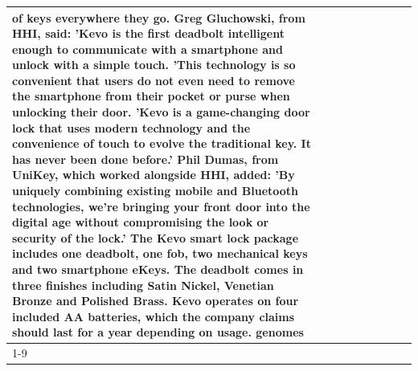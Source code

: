 \begin{table}[H]
\begin{tabular}{lllrlllll}
of keys everywhere they go. Greg Gluchowski, from HHI, said: 'Kevo is the first deadbolt intelligent enough to communicate with a smartphone and unlock with a simple touch. 'This technology is so convenient that users do not even need to remove the smartphone from their pocket or purse when unlocking their door. 'Kevo is a game-changing door lock that uses modern technology and the convenience of touch to evolve the traditional key. It has never been done before.' Phil Dumas, from UniKey, which worked alongside HHI, added: 'By uniquely combining existing mobile and Bluetooth technologies, we’re bringing your front door into the digital age without compromising the look or security of the lock.' The Kevo smart lock package includes one deadbolt, one fob, two mechanical keys and two smartphone eKeys. The deadbolt comes in three finishes including Satin Nickel, Venetian Bronze and Polished Brass. Kevo operates on four included AA batteries, which the company claims should last for a year depending on usage. genomes \\
\cline{1-9}

\end{tabular}
\end{table}
